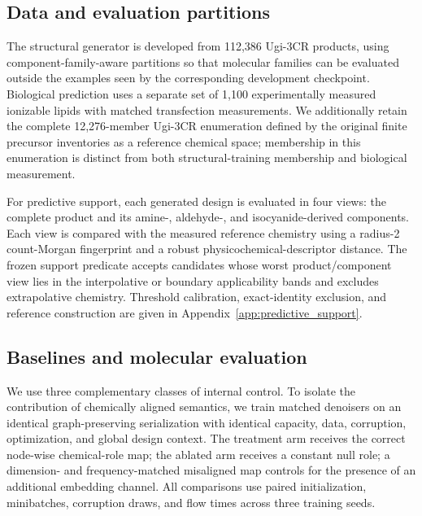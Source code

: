 \documentclass{article}
\newcommand{\SemSeeds}{three}                 %
\newcommand{\CorpusSize}{112{,}386}        %
\newcommand{\EnumSize}{12{,}276}
\newcommand{\MeasuredLipids}{1{,}100}
\begin{document}
\subsection{Data and evaluation partitions}
\label{sec:data}
The structural generator is developed from \CorpusSize{} Ugi-3CR products, using
component-family-aware partitions so that molecular families can be evaluated outside the examples
seen by the corresponding development checkpoint. Biological prediction uses a separate set of
\MeasuredLipids{} experimentally measured ionizable lipids with matched transfection
measurements. We additionally retain the complete \EnumSize{}-member Ugi-3CR enumeration
defined by the original finite precursor inventories as a reference chemical space; membership in this
enumeration is distinct from both structural-training membership and biological measurement.

For predictive support, each generated design is evaluated in four views: the complete product and its
amine-, aldehyde-, and isocyanide-derived components. Each view is compared with the measured
reference chemistry using a radius-2 count-Morgan fingerprint \citep{rogers2010extended} and a robust
physicochemical-descriptor distance. The frozen support predicate accepts candidates whose worst
product/component view lies in the interpolative or boundary applicability bands and excludes
extrapolative chemistry. Threshold calibration, exact-identity exclusion, and reference construction
are given in Appendix~\ref{app:predictive_support}.

\subsection{Baselines and molecular evaluation}
\label{sec:baselines}
We use three complementary classes of internal control. To isolate the contribution of chemically aligned
semantics, we train matched denoisers on an identical graph-preserving serialization with identical
capacity, data, corruption, optimization, and global design context. The treatment arm receives the
correct node-wise chemical-role map; the ablated arm receives a constant null role; a dimension- and
frequency-matched misaligned map controls for the presence of an additional embedding channel. All
comparisons use paired initialization, minibatches, corruption draws, and flow times across
\SemSeeds{} training seeds.
\end{document}
